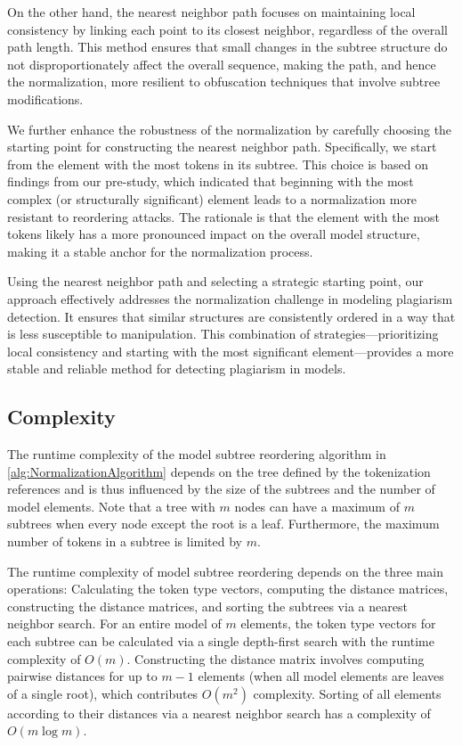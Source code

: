 On the other hand, the nearest neighbor path focuses on maintaining local consistency by linking each point to its closest neighbor, regardless of the overall path length. This method ensures that small changes in the subtree structure do not disproportionately affect the overall sequence, making the path, and hence the normalization, more resilient to obfuscation techniques that involve subtree modifications.

We further enhance the robustness of the normalization by carefully choosing the starting point for constructing the nearest neighbor path. Specifically, we start from the element with the most tokens in its subtree. This choice is based on findings from our pre-study, which indicated that beginning with the most complex (or structurally significant) element leads to a normalization more resistant to reordering attacks. The rationale is that the element with the most tokens likely has a more pronounced impact on the overall model structure, making it a stable anchor for the normalization process.

Using the nearest neighbor path and selecting a strategic starting point, our approach effectively addresses the normalization challenge in modeling plagiarism detection. It ensures that similar structures are consistently ordered in a way that is less susceptible to manipulation. This combination of strategies—prioritizing local consistency and starting with the most significant element—provides a more stable and reliable method for detecting plagiarism in models.


\subsection{Complexity}
The runtime complexity of the model subtree reordering algorithm in \autoref{alg:NormalizationAlgorithm} depends on the tree defined by the tokenization references and is thus influenced by the size of the subtrees and the number of model elements. Note that a tree with $m$ nodes can have a maximum of $m$ subtrees when every node except the root is a leaf. Furthermore, the maximum number of tokens in a subtree is limited by $m$.

The runtime complexity of model subtree reordering depends on the three main operations: Calculating the token type vectors, computing the distance matrices, constructing the distance matrices, and sorting the subtrees via a nearest neighbor search.
%
For an entire model of $m$ elements, the token type vectors for each subtree can be calculated via a single depth-first search with the runtime complexity of $O(m)$.
Constructing the distance matrix involves computing pairwise distances for up to $m-1$ elements (when all model elements are leaves of a single root), which contributes $O(m^2)$ complexity.
Sorting of all elements according to their distances via a nearest neighbor search has a complexity of $O(m \log m)$.

